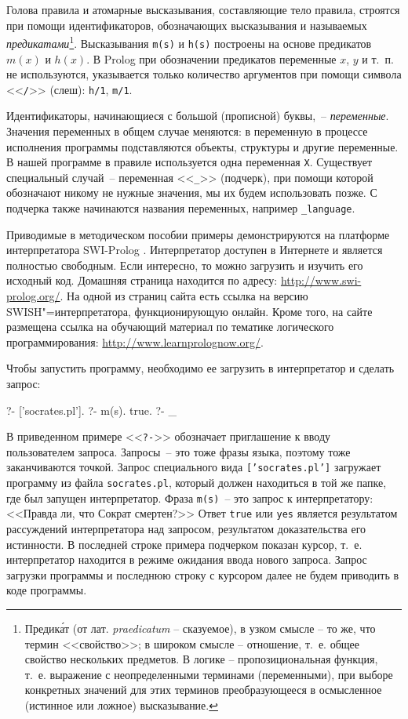 \documentclass[a4paper,14pt, openany, twoside, final]{extbook} %
\begin{document}
Голова правила и атомарные высказывания, составляющие тело правила, строятся при помощи идентификаторов, обозначающих высказывания и называемых \emph{предикатами}\footnote{Предик\'{а}т (от лат. \emph{praedicatum} -- сказуемое), в узком смысле -- то же, что термин <<свойство>>; в широком смысле -- отношение, т.~е. общее свойство нескольких предметов. В логике -- пропозициональная функция, т.~е. выражение с неопределенными терминами (переменными), при выборе конкретных значений для этих терминов преобразующееся в осмысленное (истинное или ложное) высказывание.}.  Высказывания \texttt{m(s)} и \texttt{h(s)} построены на основе предикатов $m(x)$ и $h(x)$.  В Prolog при обозначении предикатов переменные $x$, $y$ и т.~п. не используются, указывается только количество аргументов при помощи символа <<\texttt{/}>> (слеш): \texttt{h/1}, \texttt{m/1}.

Идентификаторы, начинающиеся с большой (прописной) буквы,~-- \emph{переменные}.  Значения переменных в общем случае меняются: в переменную в процессе исполнения программы подставляются объекты, структуры и другие переменные.  В нашей программе в правиле используется одна переменная \texttt{X}.  Существует специальный случай~-- переменная <<\texttt{\_}>> (подчерк), при помощи которой обозначают никому не нужные значения, мы их будем использовать позже.  С подчерка также начинаются названия переменных, например \texttt{\_language}.

Приводимые в методическом пособии примеры демонстрируются на платформе интерпретатора SWI-Prolog \cite{SWIP}.  Интерпретатор доступен в Интернете и является полностью свободным.  Если интересно, то можно загрузить и изучить его исходный код.  Домашняя страница находится по адресу: \url{http://www.swi-prolog.org/}.  На одной из страниц сайта есть ссылка на версию SWISH"=интерпретатора, функционирующую онлайн.  Кроме того, на сайте размещена ссылка на обучающий материал по тематике логического программирования: \url{http://www.learnprolognow.org/}.

Чтобы запустить программу, необходимо ее загрузить в интерпретатор и сделать запрос:
\begin{proexp}
?- ['socrates.pl'].    %
?- m(s).               %
true.
?- _
\end{proexp}

  В приведенном примере <<\texttt{?-}>> обозначает приглашение к вводу пользователем запроса.  Запросы~-- это тоже фразы языка, поэтому тоже заканчиваются точкой.  Запрос специального вида \texttt{['socrates.pl']} загружает программу из файла \texttt{socrates.pl}, который должен находиться в той же папке, где был запущен интерпретатор.  Фраза \texttt{m(s)}~-- это запрос к интерпретатору: <<Правда ли, что Сократ смертен?>>  Ответ \texttt{true} или \texttt{yes} является результатом рассуждений интерпретатора над запросом, результатом доказательства его истинности.  В последней строке примера подчерком показан курсор, т.~е. интерпретатор находится в режиме ожидания ввода нового запроса.  Запрос загрузки программы и последнюю строку с курсором далее не будем приводить в коде программы.
\end{document}
